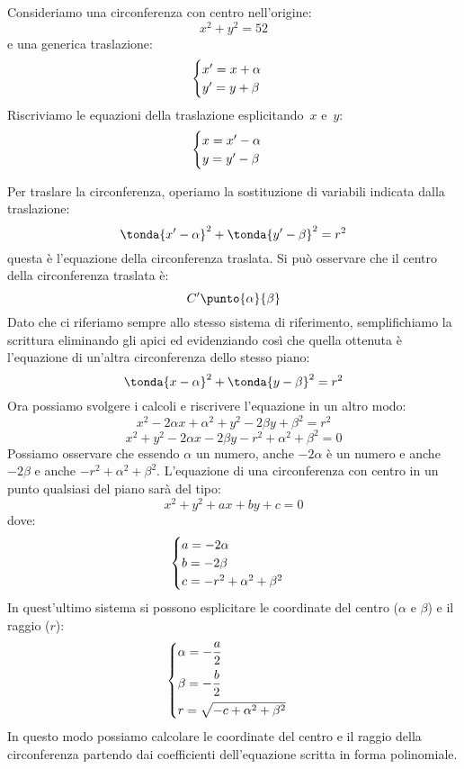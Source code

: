 Consideriamo una circonferenza con centro nell'origine:
\[x^2 + y^2 = 52\]
e una generica traslazione:
\[\begin{cases}x' = x + \alpha \\ y' = y + \beta\end{cases}\]
Riscriviamo le equazioni della traslazione esplicitando~\(x\) e~\(y\):
\[\begin{cases}x = x'- \alpha \\ y = y' - \beta\end{cases}\]

Per traslare la circonferenza, operiamo la sostituzione di variabili
indicata dalla traslazione:
\[\tonda{x'-\alpha}^2 + \tonda{y'-\beta}^2 = r^2\]
questa è l'equazione della circonferenza traslata. Si può osservare che il 
centro della circonferenza traslata è: 
\[C'\punto{\alpha}{\beta}\]
Dato che ci riferiamo sempre allo stesso sistema di riferimento, semplifichiamo 
la scrittura eliminando gli apici ed evidenziando così che quella ottenuta è 
l'equazione di un'altra circonferenza dello stesso piano:
\[\tonda{x-\alpha}^2 + \tonda{y-\beta}^2 = r^2\]
Ora possiamo svolgere i calcoli e riscrivere l'equazione in un altro modo:
\[x^2 -2 \alpha x + \alpha^2 + y^2 -2 \beta y + \beta^2 = r^2\]
\[x^2 + y^2 -2 \alpha x -2 \beta y - r^2 + \alpha^2 + \beta^2 = 0\]
Possiamo osservare che essendo \(\alpha\) un numero, anche \(-2\alpha\) è un 
numero e anche \(-2\beta\) e anche \(- r^2 + \alpha^2 + \beta^2\). 
L'equazione di una circonferenza con centro in un punto qualsiasi del piano 
sarà del tipo:
\[x^2 + y^2 +a x +b y +c = 0\]
dove:
\[\begin{cases}a = -2\alpha \\ b = -2\beta \\ c = -r^2 +\alpha^2 +\beta^2\end{cases}\]
In quest'ultimo sistema si possono esplicitare le coordinate del 
centro (\(\alpha\) e \(\beta\)) e il raggio (\(r\)):
\[\begin{cases}\alpha = -\dfrac{a}{2} \\[7pt] 
           \beta = -\dfrac{b}{2} \\[7pt]
           r = \sqrt{-c +\alpha^2 + \beta^2}\end{cases}\]
In questo modo possiamo calcolare le coordinate del centro e il raggio della 
circonferenza partendo dai coefficienti dell'equazione scritta in forma 
polinomiale.


